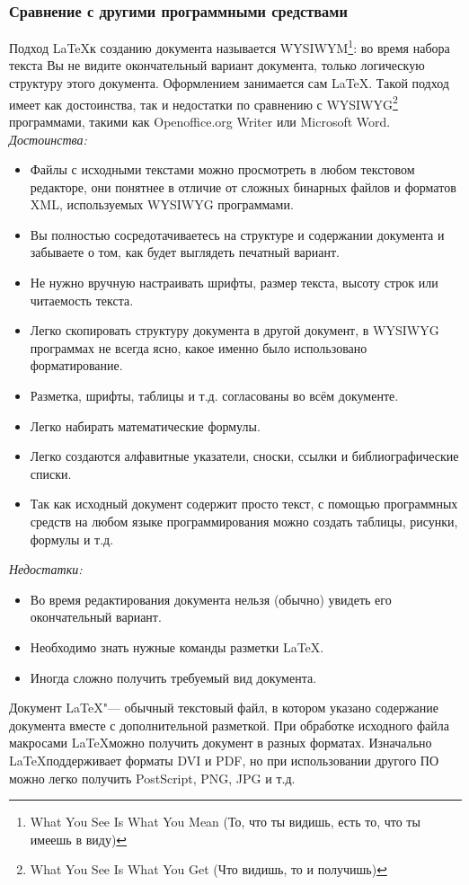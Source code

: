 \documentclass{article}
\begin{document}
		\subsubsection{Сравнение с другими программными средствами}
	Подход \LaTeX к созданию документа называется WYSIWYM\footnote{What You See Is What You Mean (То, что ты видишь, есть то, что ты имеешь в виду)}: во время набора текста Вы не видите окончательный вариант документа, только логическую структуру этого документа. Оформлением занимается сам \LaTeX. Такой подход имеет как достоинства, так и недостатки по сравнению с WYSIWYG\footnote{What You See Is What You Get (Что видишь, то и получишь)} программами, такими как Openoffice.org Writer или Microsoft Word.\\
	\textit{Достоинства:}
	\begin{itemize}
   		\item Файлы с исходными текстами можно просмотреть в любом текстовом редакторе, они понятнее в отличие от сложных бинарных файлов и форматов XML, используемых WYSIWYG программами.
   		\item Вы полностью сосредотачиваетесь на структуре и содержании документа и забываете о том, как будет выглядеть печатный вариант.
   		\item Не нужно вручную настраивать шрифты, размер текста, высоту строк или читаемость текста.
   		\item Легко скопировать структуру документа в другой документ, в WYSIWYG программах не всегда ясно, какое именно было использовано форматирование.
   		\item Разметка, шрифты, таблицы и т.д. согласованы во всём документе.
    	\item Легко набирать математические формулы.
    	\item Легко создаются алфавитные указатели, сноски, ссылки и библиографические списки.
   		\item Так как исходный документ содержит просто текст, с помощью программных средств на любом языке программирования можно создать таблицы, рисунки, формулы и т.д.
	\end{itemize}	
	\textit{Недостатки:}
	\begin{itemize}
		\item Во время редактирования документа нельзя (обычно) увидеть его окончательный вариант.
   		\item Необходимо знать нужные команды разметки \LaTeX.
   		\item Иногда сложно получить требуемый вид документа.
	\end{itemize}
	Документ \LaTeX "--- обычный текстовый файл, в котором указано содержание документа вместе с дополнительной разметкой. При обработке исходного файла макросами \LaTeX можно получить документ в разных форматах. Изначально \LaTeX поддерживает форматы DVI и PDF, но при использовании другого ПО можно легко получить PostScript, PNG, JPG и т.д.
\end{document}
